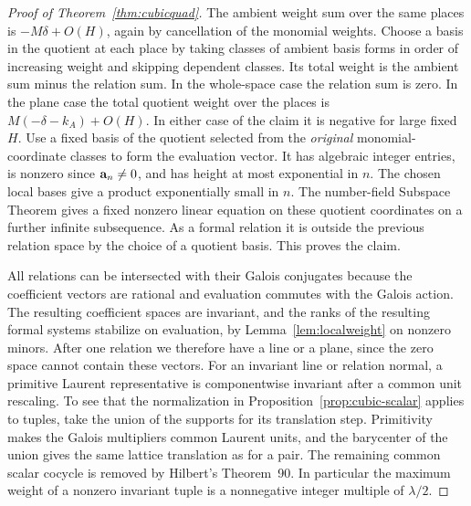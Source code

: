 \documentclass[11pt,a4paper,reqno]{amsart}
\theoremstyle{definition}
\theoremstyle{remark}
\numberwithin{equation}{section}
\begin{document}
\begin{proof}[Proof of Theorem~\ref{thm:cubicquad}]
The ambient weight sum over the same places
is \(-M\delta+O(H)\), again by cancellation of
the monomial weights. Choose a basis in the
quotient at each place by taking classes of
ambient basis forms in order of increasing
weight and skipping dependent classes.
Its total weight is the ambient sum minus the
relation sum. In the whole-space case the
relation sum is zero. In the plane case the
total quotient weight over the places is
\(M(-\delta-k_A)+O(H)\). In either case of the
claim it is negative for large fixed \(H\).
Use a fixed basis of the quotient selected
from the \emph{original} monomial-coordinate
classes to form the evaluation vector.
It has algebraic integer entries, is nonzero
since \({\bf a}_n\ne0\), and has height at most
exponential in \(n\). The chosen local bases
give a product exponentially small in \(n\).
The number-field Subspace Theorem
\cite{Schlickewei} gives a fixed nonzero
linear equation on these quotient coordinates
on a further infinite subsequence. As a formal
relation it is outside the previous relation
space by the choice of a quotient basis.
This proves the claim.

All relations can be intersected with their
Galois conjugates because the coefficient vectors
are rational and evaluation commutes with the
Galois action. The resulting coefficient spaces
are invariant, and the ranks of the resulting
formal systems stabilize on evaluation, by
Lemma~\ref{lem:localweight} on nonzero minors.
After one relation we therefore have a line
or a plane, since the zero space cannot contain
these vectors. For an invariant line or relation
normal, a primitive Laurent representative
is componentwise invariant after a common
unit rescaling. To see that the normalization
in Proposition~\ref{prop:cubic-scalar} applies to
tuples, take the union of the supports for its
translation step. Primitivity makes the Galois
multipliers common Laurent units, and the
barycenter of the union gives the same lattice
translation as for a pair. The remaining common
scalar cocycle is removed by Hilbert's Theorem~90.
In particular the maximum weight of a nonzero
invariant tuple is a nonnegative integer multiple
of \(\lambda/2\).


\end{proof}
\end{document}
